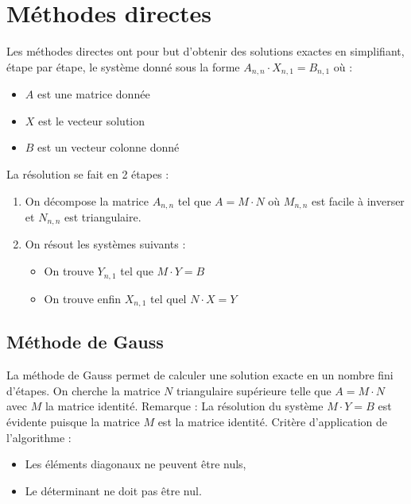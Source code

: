 \documentclass{report}
\begin{document}
  \chapter{Méthodes directes}
    Les méthodes directes ont pour but d'obtenir des solutions exactes en simplifiant, étape par étape, le système donné sous la forme 
    $A_{n,n} \cdot X_{n,1} = B_{n,1}$ où :
    \begin{itemize}
     \item{$A$ est une matrice donnée}
     \item{$X$ est le vecteur solution}
     \item{$B$ est un vecteur colonne donné}
    \end{itemize}
	\vspace{0.3cm}    
    La résolution se fait en 2 étapes :
    \begin{enumerate}
     \item{On décompose la matrice $A_{n,n}$ tel que $A = M \cdot N$ où $M_{n,n}$ est facile à inverser et $N_{n,n}$ est triangulaire.}
     \item{On résout les systèmes suivants : 
           \begin{itemize}
            \item{On trouve $Y_{n,1}$ tel que $M \cdot Y = B$}
            \item{On trouve enfin $X_{n,1} $ tel quel $N \cdot X = Y$}
           \end{itemize}
           }
    \end{enumerate}
    \section{Méthode de Gauss}
      La méthode de Gauss permet de calculer une solution exacte en un nombre fini d'étapes.
      \newline
      On cherche la matrice $N$ triangulaire supérieure telle que $A = M \cdot N$ avec $M$ la matrice identité.
      \newline
      Remarque : La résolution du système $M \cdot Y = B$ est évidente puisque la matrice $M$ est la matrice identité.
      \newline
      Critère d'application de l'algorithme :
      \begin{itemize}
        \item{Les éléments diagonaux ne peuvent être nuls,}
        \item{Le déterminant ne doit pas être nul.}
      \end{itemize}
        \lstset{language=C,showstringspaces=false}
\end{document}
